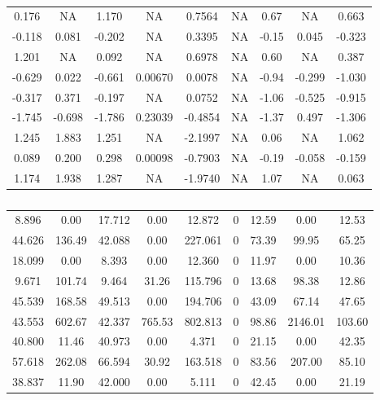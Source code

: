 \documentclass[english]{article}
\providecommand{\tabularnewline}{\\}
\begin{document}
\begin{table}
\caption{\label{tab:heatmap}}
\noindent \centering{}\begin{tabular}{ccccccccc}
0.176  &   NA  &1.170  &    NA & 0.7564  & NA & 0.67 &    NA & 0.663\tabularnewline
-0.118 & 0.081 &-0.202 &     NA&  0.3395 &  NA& -0.15&  0.045& -0.323\tabularnewline
1.201  &   NA  &0.092  &    NA & 0.6978  & NA & 0.60 &    NA & 0.387\tabularnewline
-0.629 & 0.022 &-0.661 &0.00670&  0.0078 &  NA& -0.94& -0.299& -1.030\tabularnewline
-0.317 & 0.371 &-0.197 &     NA&  0.0752 &  NA& -1.06& -0.525& -0.915\tabularnewline
-1.745 &-0.698 &-1.786 &0.23039& -0.4854 &  NA& -1.37&  0.497& -1.306\tabularnewline
1.245  &1.883  &1.251  &    NA &-2.1997  & NA & 0.06 &    NA & 1.062\tabularnewline
0.089  &0.200  &0.298 &0.00098 &-0.7903  & NA &-0.19 &-0.058 &-0.159\tabularnewline
1.174  &1.938  &1.287  &    NA &-1.9740  & NA & 1.07 &    NA & 0.063\tabularnewline
\end{tabular}
\end{table}
\clearpage{}

\begin{table}
\caption{\label{tab:obsheatmap}}
\noindent \centering{}\begin{tabular}{ccccccccc}
8.896 &  0.00 &17.712  & 0.00 & 12.872   & 0 &12.59  &  0.00  &12.53\tabularnewline
44.626& 136.49& 42.088 &  0.00& 227.061  &  0& 73.39 &  99.95 & 65.25\tabularnewline
18.099&   0.00&  8.393 &  0.00&  12.360  &  0& 11.97 &   0.00 & 10.36\tabularnewline
9.671 &101.74 & 9.464  &31.26 &115.796   & 0 &13.68  & 98.38  &12.86\tabularnewline
45.539& 168.58& 49.513 &  0.00& 194.706  &  0& 43.09 &  67.14 & 47.65\tabularnewline
43.553& 602.67& 42.337 &765.53& 802.813  &  0& 98.86 &2146.01 &103.60\tabularnewline
40.800&  11.46& 40.973 &  0.00&   4.371  &  0& 21.15 &   0.00 & 42.35\tabularnewline
57.618& 262.08& 66.594 & 30.92& 163.518  &  0& 83.56 & 207.00 & 85.10\tabularnewline
38.837&  11.90& 42.000 &  0.00&   5.111  &  0& 42.45 &   0.00 & 21.19\tabularnewline
\end{tabular}
\end{table}
\clearpage{}
\end{document}
